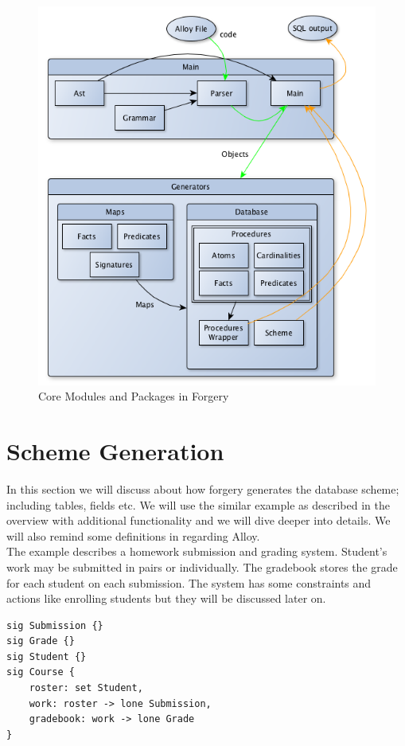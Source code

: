\documentclass[oneside]{book}
\begin{document}
\begin{figure}[h!]
\centering
\includegraphics[scale=0.5]{modules}
\caption{Core Modules and Packages in Forgery}
\end{figure}

\newpage

\section{Scheme Generation}
\label{sec:schemegen}

In this section we will discuss about how forgery generates the database scheme; including tables, fields etc. We will use the similar example as described in the overview with additional functionality and we will dive deeper into details. We will also remind some definitions in regarding Alloy.\\

\noindent The example describes a homework submission and grading system. Student's work may be submitted in pairs or individually. The gradebook stores the grade for each student on each submission. The system has some constraints and actions like enrolling students but they will be discussed later on.\\
\begin{lstlisting}
sig Submission {}
sig Grade {}
sig Student {}
sig Course {
	roster: set Student,
	work: roster -> lone Submission,
	gradebook: work -> lone Grade
}
\end{lstlisting}
\end{document}
